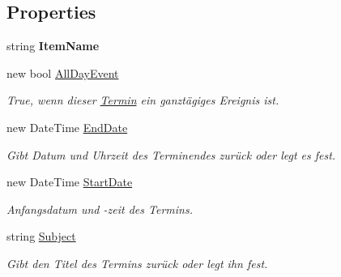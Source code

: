 \subsection*{Properties}
\begin{DoxyCompactItemize}
\item 
string {\bfseries Item\+Name}\hypertarget{class_products_1_1_model_1_1_entities_1_1_termin_a2c72c06ea55425532983624fc04ba50f}{}\label{class_products_1_1_model_1_1_entities_1_1_termin_a2c72c06ea55425532983624fc04ba50f}

\item 
new bool \hyperlink{class_products_1_1_model_1_1_entities_1_1_termin_a429d346c70033f9fd7cfe62361498f84}{All\+Day\+Event}
\begin{DoxyCompactList}\small\item\em True, wenn dieser \hyperlink{class_products_1_1_model_1_1_entities_1_1_termin}{Termin} ein ganztägiges Ereignis ist. \end{DoxyCompactList}\item 
new Date\+Time \hyperlink{class_products_1_1_model_1_1_entities_1_1_termin_acad62a89c26543e2832f36f3848ce49b}{End\+Date}
\begin{DoxyCompactList}\small\item\em Gibt Datum und Uhrzeit des Terminendes zurück oder legt es fest. \end{DoxyCompactList}\item 
new Date\+Time \hyperlink{class_products_1_1_model_1_1_entities_1_1_termin_a9a8cd07acc481ea1ac38831de7153a37}{Start\+Date}
\begin{DoxyCompactList}\small\item\em Anfangsdatum und -\/zeit des Termins. \end{DoxyCompactList}\item 
string \hyperlink{class_products_1_1_model_1_1_entities_1_1_termin_a1b6185a4b4fc0c78248c1e323bf8f830}{Subject}
\begin{DoxyCompactList}\small\item\em Gibt den Titel des Termins zurück oder legt ihn fest. \end{DoxyCompactList}\item 

\end{DoxyCompactItemize}
